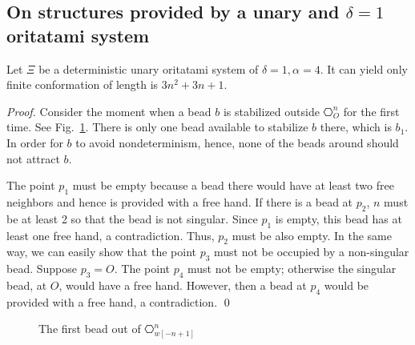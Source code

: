 

\subsection{On structures provided by a unary and $\delta = 1$ oritatami system}


\begin{theorem}[$\delta = 1, \alpha = 4$]
Let $\Xi$ be a deterministic unary oritatami system of $\delta = 1, \alpha = 4$. It can yield only finite conformation of length is $3n^2  + 3n + 1$.
\end{theorem}

\begin{proof}
Consider the moment when a bead $b$ is stabilized outside $\hexagon_O^n$ for the first time. 
See Fig.~\ref{TTT_a4_first}.
There is only one bead available to stabilize $b$ there, which is $b_1$. 
In order for $b$ to avoid nondeterminism, hence, none of the beads around should not attract $b$. 

The point $p_1$ must be empty because a bead there would have at least two free neighbors and hence is provided with a free hand. 
If there is a bead at $p_2$, $n$ must be at least 2 so that the bead is not singular. 
Since $p_1$ is empty, this bead has at least one free hand, a contradiction. 
Thus, $p_2$ must be also empty. 
In the same way, we can easily show that the point $p_3$ must not be occupied by a non-singular bead. 
Suppose $p_3 = O$. 
The point $p_4$ must not be empty; otherwise the singular bead, at $O$, would have a free hand. 
However, then a bead at $p_4$ would be provided with a free hand, a contradiction. 
\qed
\end{proof}

\begin{figure}[tb]
 \centering
    \caption{The first bead out of $\hexagon_{w[-n+1]}^n$}
    \label{TTT_a4_first}
\end{figure}


